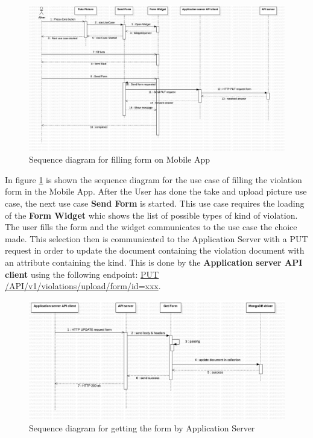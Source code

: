 \begin{figure}[H]
\centering
\includegraphics[width=\textwidth]{Images/DDSeqAppForm.png}
\caption{\label{fig:DDSeqAppForm} Sequence diagram for filling form on Mobile App}
\end{figure}
In figure \ref{fig:DDSeqAppForm} is shown the sequence diagram for the use case of filling the violation form in the Mobile App.
After the User has done the take and upload picture use case, the next use case \textbf{Send Form} is started. This use case requires the loading of the \textbf{Form Widget} whic shows the list of possible types of kind of violation. The user fills the form and the widget communicates to the use case the choice made. This selection then is communicated to the Application Server with a PUT request in order to update the document containing the violation document with an attribute containing the kind. This is done by the \textbf{Application server API client} using the following endpoint: \url{PUT} \url{/API/v1/violations/upload/form/id=xxx}.


\begin{figure}[H]
\centering
\includegraphics[width=\textwidth]{Images/DDSeqSeverForm.png}
\caption{\label{fig:DDSeqSeverForm} Sequence diagram for getting the form by Application Server}
\end{figure}

